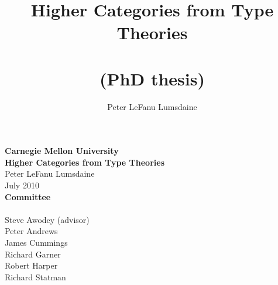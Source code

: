 \documentclass[11pt]{amsbook}
\begin{document}
\frontmatter



\title{Higher Categories from Type Theories \\~\\ \normalsize (PhD thesis)}

\author[P. LeF. Lumsdaine]{Peter LeFanu Lumsdaine}


\maketitle
\newpage
\thispagestyle{empty}
\begin{center}
  {\Large\textbf{Carnegie Mellon University}}\\
  \vspace{1cm}
  {\large\textbf{Higher Categories from Type Theories}}\\
  \vspace{.5cm}
  Peter LeFanu Lumsdaine\\
  \vspace{.5cm}
  July 2010\\
  \vspace{3cm}
  \textbf{Committee}\\~\\
  Steve Awodey (advisor)\\
  Peter Andrews \\
  James Cummings \\
  Richard Garner \\
  Robert Harper \\
  Richard Statman \\

\end{center}
 
\setcounter{page}{3}




\tableofcontents

\end{document}
